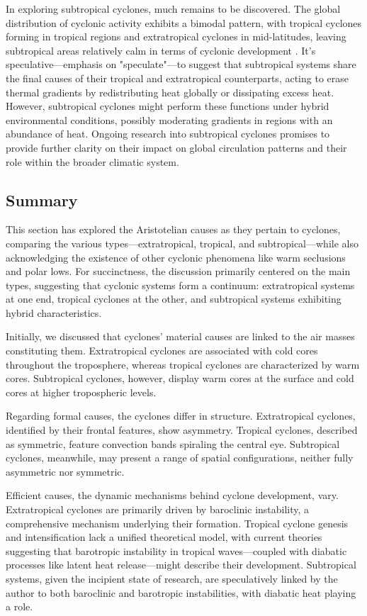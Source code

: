 In exploring subtropical cyclones, much remains to be discovered. The global distribution of cyclonic activity exhibits a bimodal pattern, with tropical cyclones forming in tropical regions and extratropical cyclones in mid-latitudes, leaving subtropical areas relatively calm in terms of cyclonic development \citep{yanase2014parameter}. It's speculative—emphasis on "speculate"—to suggest that subtropical systems share the final causes of their tropical and extratropical counterparts, acting to erase thermal gradients by redistributing heat globally or dissipating excess heat. However, subtropical cyclones might perform these functions under hybrid environmental conditions, possibly moderating gradients in regions with an abundance of heat. Ongoing research into subtropical cyclones promises to provide further clarity on their impact on global circulation patterns and their role within the broader climatic system.

\subsection{Summary}

This section has explored the Aristotelian causes as they pertain to cyclones, comparing the various types—extratropical, tropical, and subtropical—while also acknowledging the existence of other cyclonic phenomena like warm seclusions and polar lows. For succinctness, the discussion primarily centered on the main types, suggesting that cyclonic systems form a continuum: extratropical systems at one end, tropical cyclones at the other, and subtropical systems exhibiting hybrid characteristics.

Initially, we discussed that cyclones' material causes are linked to the air masses constituting them. Extratropical cyclones are associated with cold cores throughout the troposphere, whereas tropical cyclones are characterized by warm cores. Subtropical cyclones, however, display warm cores at the surface and cold cores at higher tropospheric levels.

Regarding formal causes, the cyclones differ in structure. Extratropical cyclones, identified by their frontal features, show asymmetry. Tropical cyclones, described as symmetric, feature convection bands spiraling the central eye. Subtropical cyclones, meanwhile, may present a range of spatial configurations, neither fully asymmetric nor symmetric.

Efficient causes, the dynamic mechanisms behind cyclone development, vary. Extratropical cyclones are primarily driven by baroclinic instability, a comprehensive mechanism underlying their formation. Tropical cyclone genesis and intensification lack a unified theoretical model, with current theories suggesting that barotropic instability in tropical waves—coupled with diabatic processes like latent heat release—might describe their development. Subtropical systems, given the incipient state of research, are speculatively linked by the author to both baroclinic and barotropic instabilities, with diabatic heat playing a role.

